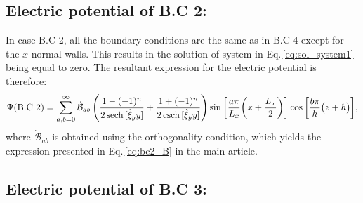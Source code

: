 \documentclass[aps,prfluids,reprint,superscriptaddress]{revtex4-2}
\newcommand{\ii}[1]{\text{#1}}
\newcommand{\RN}[1]{%
	\textup{\uppercase\expandafter{\romannumeral#1}}%
}
\numberwithin{equation}{section}
\begin{document}
\subsection{Electric potential of B.C 2:}

In case B.C 2, all the boundary conditions are the same as in B.C 4 except for the $x$-normal walls. This results in the solution of system \RN{1} in Eq.\,\eqref{eq:sol_system1} being equal to zero. The resultant expression for the electric potential is therefore:
\begin{gather}
	\Psi (\ii{B.C 2})= 
	\sum_{a,b=0}^{\infty}
	\grave{\mathcal{B}}_{ab} 
	\left(
	\frac{1-(-1)^n}{2\sech{[\grave\xi_y y]}} + \frac{1+(-1)^n}{2\csch{[\grave\xi_y y]}}
	\right)
	\sin{\biggl[ \frac{a\pi}{L_x}\biggl(x + \frac{L_x}{2}\biggr)\biggr]}
	\cos{\biggl[ \frac{b\pi}{h}\bigl(z + h\bigr)\biggr]}
	,
\end{gather}
where $\grave{\mathcal{B}}_{ab}$ is obtained using the orthogonality condition, which yields the expression presented in Eq.\,\eqref{eq:bc2_B} in the main article.

\subsection{Electric potential of B.C 3:}
\end{document}
